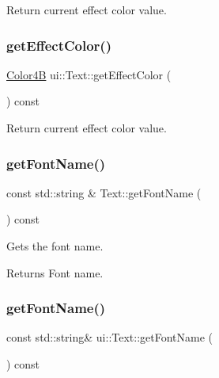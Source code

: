 Return current effect color value. \mbox{\label{classui_1_1Text_aa9fd5963e5d30257d9f2558d90cbd5e8}} 
\subsubsection{\texorpdfstring{get\+Effect\+Color()}{getEffectColor()}\hspace{0.1cm}{\footnotesize\ttfamily [2/2]}}
{\footnotesize\ttfamily \hyperlink{structColor4B}{Color4B} ui\+::\+Text\+::get\+Effect\+Color (\begin{DoxyParamCaption}{ }\end{DoxyParamCaption}) const}

Return current effect color value. \mbox{\label{classui_1_1Text_acaddbad02a8d58bba6af322c09e05beb}} 
\subsubsection{\texorpdfstring{get\+Font\+Name()}{getFontName()}\hspace{0.1cm}{\footnotesize\ttfamily [1/2]}}
{\footnotesize\ttfamily const std\+::string \& Text\+::get\+Font\+Name (\begin{DoxyParamCaption}{ }\end{DoxyParamCaption}) const}

Gets the font name.

\begin{DoxyReturn}{Returns}
Font name. 
\end{DoxyReturn}
\mbox{\label{classui_1_1Text_aabb9872206c0304121dec048a4ef6bf0}} 
\subsubsection{\texorpdfstring{get\+Font\+Name()}{getFontName()}\hspace{0.1cm}{\footnotesize\ttfamily [2/2]}}
{\footnotesize\ttfamily const std\+::string\& ui\+::\+Text\+::get\+Font\+Name (\begin{DoxyParamCaption}{ }\end{DoxyParamCaption}) const}

